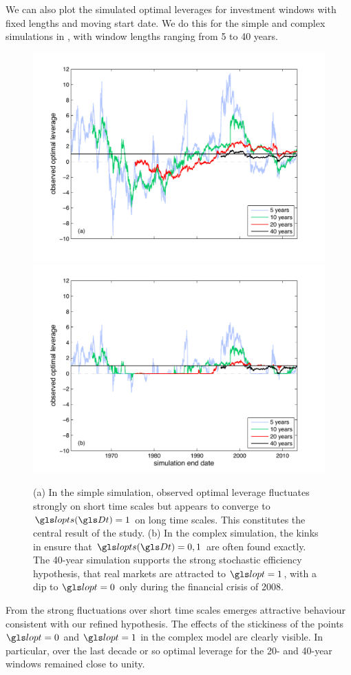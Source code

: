 We can also plot the simulated optimal leverages for investment windows with fixed lengths and moving start date. We do this for the simple and complex simulations in , with window lengths ranging from 5 to 40 years.
\begin{figure}
\includegraphics[width=1.\textwidth]{./chapter_4/figs/sme_fig5a.pdf}
\includegraphics[width=1.\textwidth]{./chapter_4/figs/sme_fig5b.pdf}
\caption{\newline
(a) In the simple simulation, observed optimal leverage fluctuates strongly on short time scales but appears to converge to $\lopts(\Dt)=1$ on long time scales. This constitutes the central result of the study.
\newline
(b) In the complex simulation, the kinks in  ensure that $\lopts(\Dt)=0,1$ are often found exactly. The 40-year simulation supports the strong stochastic efficiency hypothesis, that real markets are attracted to $\lopt=1$, with a dip to $\lopt=0$ only during the financial crisis of 2008. }
\end{figure}
From the strong fluctuations over short time scales emerges attractive behaviour consistent with our refined hypothesis. The effects of the stickiness of the points $\lopt=0$ and $\lopt=1$ in the complex model are clearly visible. In particular, over the last decade or so optimal leverage for the 20- and 40-year windows remained close to unity.


